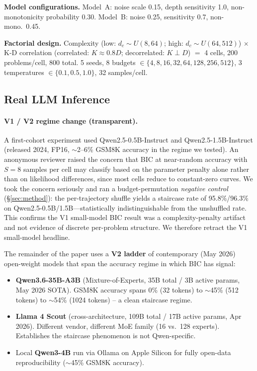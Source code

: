 \documentclass{article}
\begin{document}
\textbf{Model configurations.}  Model~A: noise scale 0.15, depth sensitivity 1.0, non-monotonicity probability 0.30.  Model~B: noise 0.25, sensitivity 0.7, non-mono.\ 0.45.

\textbf{Factorial design.}  Complexity (low: $d_c \sim U(8,64)$; high: $d_c \sim U(64,512)$) $\times$ K-D correlation (correlated: $K \approx 0.8D$; decorrelated: $K \perp D$) $=$ 4 cells, 200 problems/cell, 800 total.  5 seeds, 8 budgets $\in \{4, 8, 16, 32, 64, 128, 256, 512\}$, 3 temperatures $\in \{0.1, 0.5, 1.0\}$, 32 samples/cell.

\subsection{Real LLM Inference}

\paragraph{V1 / V2 regime change (transparent).}
A first-cohort experiment used Qwen2.5-0.5B-Instruct and Qwen2.5-1.5B-Instruct (released 2024, FP16, $\sim$2--6\% GSM8K accuracy in the regime we tested).  An anonymous reviewer raised the concern that BIC at near-random accuracy with $S{=}8$ samples per cell may classify based on the parameter penalty alone rather than on likelihood differences, since most cells reduce to constant-zero curves.  We took the concern seriously and ran a budget-permutation \emph{negative control} (\S\ref{sec:method}): the per-trajectory shuffle yields a staircase rate of 95.8\%/96.3\% on Qwen2.5-0.5B/1.5B---statistically indistinguishable from the unshuffled rate.  This confirms the V1 small-model BIC result was a complexity-penalty artifact and not evidence of discrete per-problem structure.  We therefore retract the V1 small-model headline.

The remainder of the paper uses a \textbf{V2 ladder} of contemporary (May 2026) open-weight models that span the accuracy regime in which BIC has signal:
\begin{itemize}[leftmargin=*,itemsep=1pt]
    \item \textbf{Qwen3.6-35B-A3B} (Mixture-of-Experts, 35B total / 3B active params, May 2026 SOTA).  GSM8K accuracy spans 0\% (32 tokens) to $\sim$45\% (512 tokens) to $\sim$54\% (1024 tokens) -- a clean staircase regime.
    \item \textbf{Llama 4 Scout} (cross-architecture, 109B total / 17B active params, Apr 2026).  Different vendor, different MoE family (16 vs.\ 128 experts).  Establishes the staircase phenomenon is not Qwen-specific.
    \item Local \textbf{Qwen3-4B} run via Ollama on Apple Silicon for fully open-data reproducibility ($\sim$45\% GSM8K accuracy).
\end{itemize}
\end{document}
